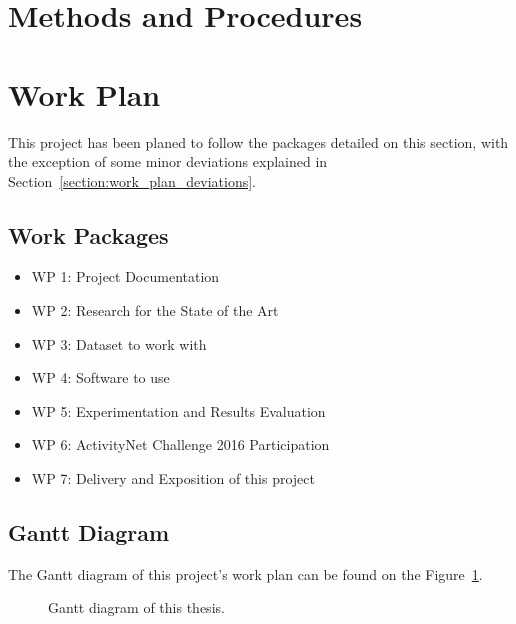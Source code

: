 
\section{Methods and Procedures}

\section{Work Plan}

This project has been planed to follow the packages detailed on this section, with the exception of some minor deviations explained in Section~\ref{section:work_plan_deviations}.

\subsection{Work Packages}

\begin{itemize}
    \item WP 1: Project Documentation
    \item WP 2: Research for the State of the Art
    \item WP 3: Dataset to work with
    \item WP 4: Software to use
    \item WP 5: Experimentation and Results Evaluation
    \item WP 6: ActivityNet Challenge 2016 Participation
    \item WP 7: Delivery and Exposition of this project
\end{itemize}

\subsection{Gantt Diagram}

The Gantt diagram of this project's work plan can be found on the Figure~\ref{fig:gantt_diagram}.

\begin{figure}[H]
\begin{center}
\end{center}
\caption{Gantt diagram of this thesis.}
\label{fig:gantt_diagram}
\end{figure}

